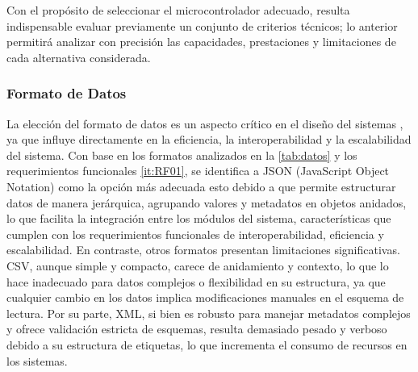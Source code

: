 Con el propósito de seleccionar el microcontrolador
adecuado, resulta indispensable evaluar previamente un 
conjunto de criterios técnicos; lo anterior permitirá analizar
con precisión las capacidades, prestaciones y limitaciones de cada alternativa considerada.

\subsubsection{Formato de Datos}
La elección del formato de datos es un aspecto crítico en el diseño del sistemas 
, ya que influye directamente en la eficiencia, la interoperabilidad y 
la escalabilidad del sistema. Con base en los formatos analizados en la 
\cref{tab:datos} y los requerimientos funcionales \ref{it:RF01}, se identifica a JSON (JavaScript Object Notation)
como la opción más adecuada esto debido a que permite estructurar datos de 
manera jerárquica, agrupando valores y metadatos en objetos anidados, lo que facilita la integración 
entre los módulos del sistema, características que cumplen con los requerimientos funcionales de interoperabilidad, 
eficiencia y escalabilidad.
En contraste, otros formatos presentan limitaciones significativas. CSV, aunque simple y compacto, carece de anidamiento 
y contexto, lo que lo hace inadecuado para datos complejos o flexibilidad en su estructura, ya que cualquier 
cambio en los datos implica modificaciones manuales en el esquema de lectura. Por su parte, XML, si bien es robusto para manejar 
metadatos complejos y ofrece validación estricta de esquemas, resulta demasiado pesado y verboso debido a su estructura de etiquetas, 
lo que incrementa el consumo de recursos en los sistemas.

\begingroup
\setlength{\tabcolsep}{3pt} 
\renewcommand{\arraystretch}{1.5} %
\footnotesize 

